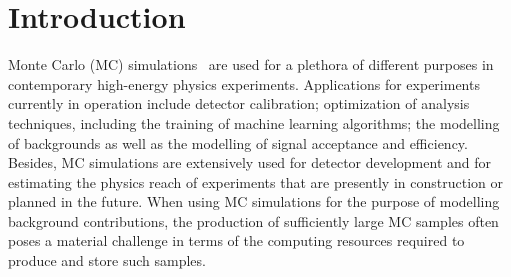 \section{Introduction}
\label{sec:introduction}

Monte Carlo (MC) simulations~\cite{XXX} are used for a plethora of different purposes in contemporary high-energy physics experiments.
Applications for experiments currently in operation include detector calibration; optimization of analysis techniques, including the training of machine learning algorithms;
the modelling of backgrounds as well as the modelling of signal acceptance and efficiency.
Besides, MC simulations are extensively used for detector development and for estimating the physics reach of experiments that are presently in construction or planned in the future.
When using MC simulations for the purpose of modelling background contributions,
the production of sufficiently large MC samples often poses a material challenge in terms of the computing resources required to produce and store such samples.

